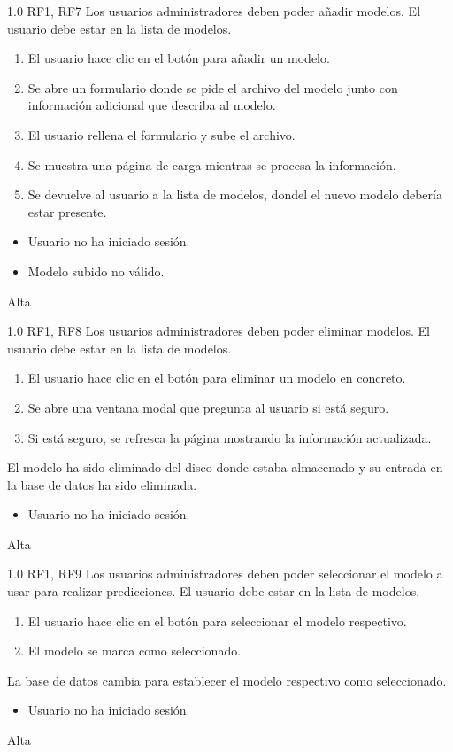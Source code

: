 {1.0}
{RF1, RF7}
{Los usuarios administradores deben poder añadir modelos.}
{El usuario debe estar en la lista de modelos.}
{
    \begin{enumerate}
        \def\labelenumi{\arabic{enumi}.}
        \tightlist
        \item El usuario hace clic en el botón para añadir un modelo.
        \item Se abre un formulario donde se pide el archivo del modelo junto
              con información adicional que describa al modelo.
        \item El usuario rellena el formulario y sube el archivo.
        \item Se muestra una página de carga mientras se procesa la información.
        \item Se devuelve al usuario a la lista de modelos, dondel el nuevo
              modelo debería estar presente.
    \end{enumerate}
}
{}
{
    \begin{itemize}
        \item Usuario no ha iniciado sesión.
        \item Modelo subido no válido.
    \end{itemize}
}
{Alta}

{1.0}
{RF1, RF8}
{Los usuarios administradores deben poder eliminar modelos.}
{El usuario debe estar en la lista de modelos.}
{
    \begin{enumerate}
        \def\labelenumi{\arabic{enumi}.}
        \tightlist
        \item El usuario hace clic en el botón para eliminar un modelo en concreto.
        \item Se abre una ventana modal que pregunta al usuario si está seguro.
        \item Si está seguro, se refresca la página mostrando la información actualizada.
    \end{enumerate}
}
{
    El modelo ha sido eliminado del disco donde estaba almacenado y su entrada en
    la base de datos ha sido eliminada.
}
{
    \begin{itemize}
        \item Usuario no ha iniciado sesión.
    \end{itemize}
}
{Alta}

{1.0}
{RF1, RF9}
{Los usuarios administradores deben poder seleccionar el modelo a usar para realizar predicciones.}
{El usuario debe estar en la lista de modelos.}
{
    \begin{enumerate}
        \def\labelenumi{\arabic{enumi}.}
        \tightlist
        \item El usuario hace clic en el botón para seleccionar el modelo respectivo.
        \item El modelo se marca como seleccionado.
    \end{enumerate}
}
{
    La base de datos cambia para establecer el modelo respectivo como seleccionado.
}
{
    \begin{itemize}
        \item Usuario no ha iniciado sesión.
    \end{itemize}
}
{Alta}
